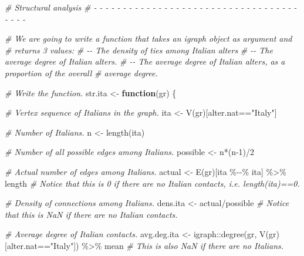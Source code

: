\documentclass[
]{book}
\newenvironment{Shaded}{\begin{snugshade}}{\end{snugshade}}
\newcommand{\CommentTok}[1]{\textcolor[rgb]{0.56,0.35,0.01}{\textit{#1}}}
\newcommand{\ControlFlowTok}[1]{\textcolor[rgb]{0.13,0.29,0.53}{\textbf{#1}}}
\newcommand{\DecValTok}[1]{\textcolor[rgb]{0.00,0.00,0.81}{#1}}
\newcommand{\FunctionTok}[1]{\textcolor[rgb]{0.00,0.00,0.00}{#1}}
\newcommand{\NormalTok}[1]{#1}
\newcommand{\OtherTok}[1]{\textcolor[rgb]{0.56,0.35,0.01}{#1}}
\newcommand{\SpecialCharTok}[1]{\textcolor[rgb]{0.00,0.00,0.00}{#1}}
\newcommand{\StringTok}[1]{\textcolor[rgb]{0.31,0.60,0.02}{#1}}
\begin{document}
\begin{Shaded}
\begin{Highlighting}[]
\CommentTok{\# Structural analysis}
\CommentTok{\# {-} {-} {-} {-} {-} {-} {-} {-} {-} {-} {-} {-} {-} {-} {-} {-} {-} {-} {-} {-} {-} {-} {-} {-} {-} {-} {-} {-} {-} {-} {-} {-} {-} {-} {-} {-} {-} {-} {-} }

\CommentTok{\# We are going to write a function that takes an igraph object as argument and }
\CommentTok{\# returns 3 values:}
\CommentTok{\# {-}{-} The density of ties among Italian alters}
\CommentTok{\# {-}{-} The average degree of Italian alters.}
\CommentTok{\# {-}{-} The average degree of Italian alters, as a proportion of the overall}
\CommentTok{\# average degree.}

\CommentTok{\# Write the function.}
\NormalTok{str.ita }\OtherTok{\textless{}{-}} \ControlFlowTok{function}\NormalTok{(gr) \{}
  
  \CommentTok{\# Vertex sequence of Italians in the graph.}
\NormalTok{  ita }\OtherTok{\textless{}{-}} \FunctionTok{V}\NormalTok{(gr)[alter.nat}\SpecialCharTok{==}\StringTok{"Italy"}\NormalTok{]}
  
  \CommentTok{\# Number of Italians.}
\NormalTok{  n }\OtherTok{\textless{}{-}} \FunctionTok{length}\NormalTok{(ita)}
  
  \CommentTok{\# Number of all possible edges among Italians.}
\NormalTok{  possible }\OtherTok{\textless{}{-}}\NormalTok{ n}\SpecialCharTok{*}\NormalTok{(n}\DecValTok{{-}1}\NormalTok{)}\SpecialCharTok{/}\DecValTok{2}
  
  \CommentTok{\# Actual number of edges among Italians.}
\NormalTok{  actual }\OtherTok{\textless{}{-}} \FunctionTok{E}\NormalTok{(gr)[ita }\SpecialCharTok{\%{-}{-}\%}\NormalTok{ ita] }\SpecialCharTok{\%\textgreater{}\%}\NormalTok{ length}
  \CommentTok{\# Notice that this is 0 if there are no Italian contacts, i.e. length(ita)==0.}
  
  \CommentTok{\# Density of connections among Italians.}
\NormalTok{  dens.ita }\OtherTok{\textless{}{-}}\NormalTok{ actual}\SpecialCharTok{/}\NormalTok{possible}
  \CommentTok{\# Notice that this is NaN if there are no Italian contacts.}
  
  \CommentTok{\# Average degree of Italian contacts.}
\NormalTok{  avg.deg.ita }\OtherTok{\textless{}{-}}\NormalTok{ igraph}\SpecialCharTok{::}\FunctionTok{degree}\NormalTok{(gr, }\FunctionTok{V}\NormalTok{(gr)[alter.nat}\SpecialCharTok{==}\StringTok{"Italy"}\NormalTok{]) }\SpecialCharTok{\%\textgreater{}\%}\NormalTok{ mean}
  \CommentTok{\# This is also NaN if there are no Italians.}
  

\end{Highlighting}
\end{Shaded}
\end{document}
